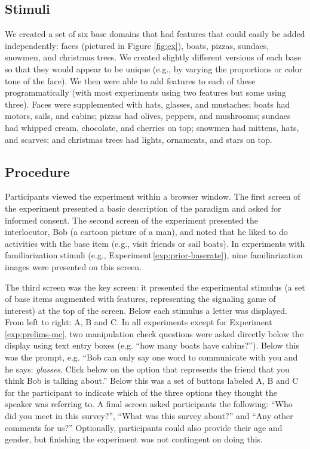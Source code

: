 \documentclass[man,noapacite]{apa2}
\newcounter{Experiment}
\newcommand{\exptref}[1]{Experiment\,\ref{#1}}
\begin{document}
\subsection{Stimuli}

We created a set of six base domains that had features that could easily be added independently: faces (pictured in Figure \ref{fig:ex}), boats, pizzas, sundaes, snowmen, and christmas trees. We created slightly different versions of each base so that they would appear to be unique (e.g., by varying the proportions or color tone of the face). We then were able to add features to each of these programmatically (with most experiments using two features but some using three). Faces were supplemented with hats, glasses, and mustaches; boats had motors, sails, and cabins; pizzas had olives, peppers, and mushrooms; sundaes had whipped cream, chocolate, and cherries on top; snowmen had mittens, hats, and scarves; and christmas trees had lights, ornaments, and stars on top.

\subsection{Procedure}

Participants viewed the experiment within a browser window. The first screen of the experiment presented a basic description of the paradigm and asked for informed consent. The second screen of the experiment presented the interlocutor, Bob (a cartoon picture of a man), and noted that he liked to do activities with the base item (e.g., visit friends or sail boats). In experiments with familiarization stimuli (e.g., \exptref{exp:prior-baserate}), nine familiarization images were presented on this screen.

The third screen was the key screen: it presented the experimental stimulus (a set of base items augmented with features, representing the signaling game of interest) at the top of the screen. Below each stimulus a letter was displayed. From left to right: A, B and C. In all experiments except for \exptref{exp:prelims-mc}, two manipulation check questions were asked directly below the display using text entry boxes (e.g. ``how many boats have cabins?''). Below this was the prompt, e.g. ``Bob can only say one word to communicate with you and he says: {\it glasses}. Click below on the option that represents the friend that you think Bob is talking about.'' Below this was a set of buttons labeled A, B and C for the participant to indicate which of the three options they thought the speaker was referring to. A final screen asked participants the following: ``Who did you meet in this survey?'',  ``What was this survey about?'' and ``Any other comments for us?'' Optionally, participants could also provide their age and gender, but finishing the experiment was not contingent on doing this.
\end{document}
